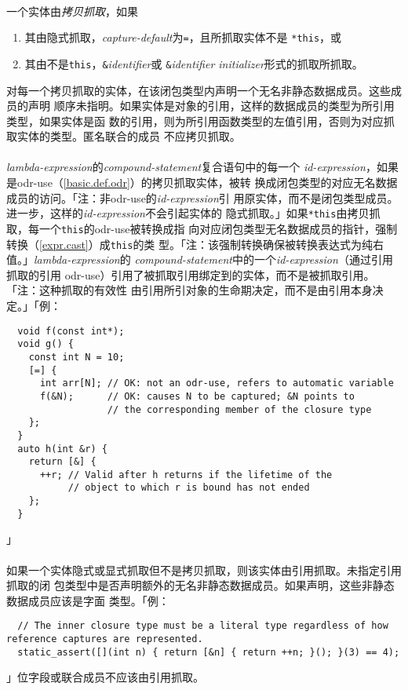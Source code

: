 \paragraph{}
一个实体由\textit{拷贝抓取}，如果
\begin{enumerate}
  \item{其由隐式抓取，\textit{capture-default}为\texttt{=}，且所抓取实体不是
    \texttt{*this}，或}
  \item{其由不是\texttt{this}，\texttt{\&}\textit{identifier}或
    \texttt{\&}\textit{identifier initializer}形式的抓取所抓取。}
\end{enumerate}
对每一个拷贝抓取的实体，在该闭包类型内声明一个无名非静态数据成员。这些成员的声明
顺序未指明。如果实体是对象的引用，这样的数据成员的类型为所引用类型，如果实体是函
数的引用，则为所引用函数类型的左值引用，否则为对应抓取实体的类型。匿名联合的成员
不应拷贝抓取。

\paragraph{}
\textit{lambda-expression}的\textit{compound-statement}复合语句中的每一个
\textit{id-expression}，如果是odr-use（\ref{basic.def.odr}）的拷贝抓取实体，被转
换成闭包类型的对应无名数据成员的访问。「注：非odr-use的\textit{id-expression}引
用原实体，而不是闭包类型成员。进一步，这样的\textit{id-expression}不会引起实体的
隐式抓取。」如果\texttt{*this}由拷贝抓取，每一个\texttt{this}的odr-use被转换成指
向对应闭包类型无名数据成员的指针，强制转换（\ref{expr.cast}）成\texttt{this}的类
型。「注：该强制转换确保被转换表达式为纯右值。」\textit{lambda-expression}的
\textit{compound-statement}中的一个\textit{id-expression}（通过引用抓取的引用
odr-use）引用了被抓取引用绑定到的实体，而不是被抓取引用。「注：这种抓取的有效性
由引用所引对象的生命期决定，而不是由引用本身决定。」「例：
\begin{lstlisting}
  void f(const int*);
  void g() {
    const int N = 10;
    [=] {
      int arr[N]; // OK: not an odr-use, refers to automatic variable
      f(&N);      // OK: causes N to be captured; &N points to
                  // the corresponding member of the closure type
    };
  }
  auto h(int &r) {
    return [&] {
      ++r; // Valid after h returns if the lifetime of the
           // object to which r is bound has not ended
    };
  }
\end{lstlisting}」

\paragraph{}
如果一个实体隐式或显式抓取但不是拷贝抓取，则该实体由引用抓取。未指定引用抓取的闭
包类型中是否声明额外的无名非静态数据成员。如果声明，这些非静态数据成员应该是字面
类型。「例：
\begin{lstlisting}
  // The inner closure type must be a literal type regardless of how reference captures are represented.
  static_assert([](int n) { return [&n] { return ++n; }(); }(3) == 4);
\end{lstlisting}」位字段或联合成员不应该由引用抓取。

